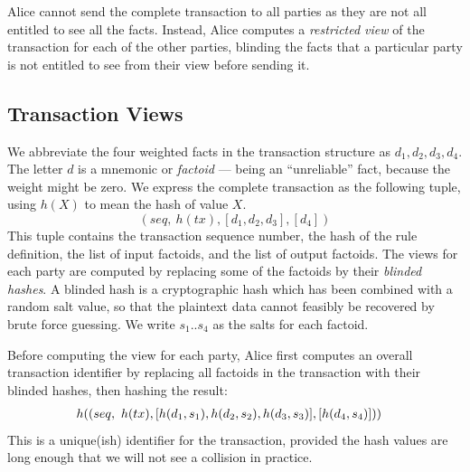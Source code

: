 Alice cannot send the complete transaction to all parties as they are not all entitled to see all the facts. Instead, Alice computes a \emph{restricted view} of the transaction for each of the other parties, blinding the facts that a particular party is not entitled to see from their view before sending it.


\subsection{Transaction Views}
We abbreviate the four weighted facts in the transaction structure as $d_1, d_2, d_3, d_4$. The letter $d$ is a mnemonic or \emph{factoid} --- being an ``unreliable'' fact, because the weight might be zero. We express the complete transaction as the following tuple, using $h(X)$ to mean the hash of value $X$.
$$
 (seq,~ h(tx), [d_1, d_2, d_3], [d_4])
$$
This tuple contains the transaction sequence number, the hash of the rule definition, the list of input factoids, and the list of output factoids. The views for each party are computed by replacing some of the factoids by their \emph{blinded hashes}. A blinded hash is a cryptographic hash which has been combined with a random salt value, so that the plaintext data cannot feasibly be recovered by brute force guessing. We write $s_1 .. s_4$ as the salts for each factoid.

Before computing the view for each party, Alice first computes an overall transaction identifier by replacing all factoids in the transaction with their blinded hashes, then hashing the result:
$$
\begin{array}{rl}
 \hspace{-2ex} h((seq,~ h(tx), [h(d_1, s_1), h(d_2, s_2), h(d_3, s_3)], [h(d_4, s_4)]))
\end{array}
$$
This is a unique(ish) identifier for the transaction, provided the hash values are long enough that we will not see a collision in practice.

